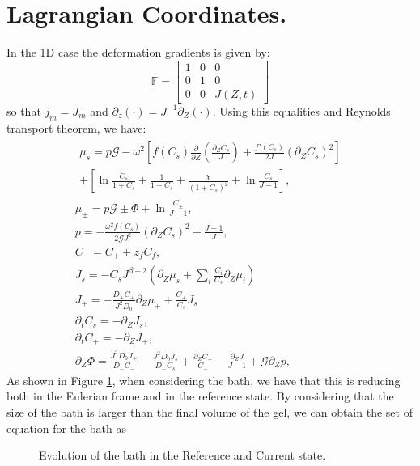 \documentclass[12pt]{extarticle}
\newcommand{\F}{\ensuremath{\mathbb{F}}}
\begin{document}
\section{Lagrangian Coordinates.}
In the 1D case the deformation gradients is given by:
\begin{equation}
\F=\begin{bmatrix}
1 & 0&0\\
0 & 1 & 0 \\
0 & 0 & J(Z,t)
\end{bmatrix}
\end{equation}
so that $j_m=J_m$ and $\partial_z(\cdot)=J^{-1}\partial_Z(\cdot)$. Using this equalities and Reynolds transport theorem, we have:
\begin{gather}
\begin{aligned}
\mu_s = p \mathcal{G}  - \omega^2\left[f(C_s)\frac{\partial}{\partial Z} \left(\frac{\partial_ZC_s}{J}\right)+\frac{f'(C_s)}{2J}\left(\partial_Z C_s\right)^2\right]\\
+ \left[\ln \frac{C_s}{1+C_s} + \frac{1}{1+C_s}+\frac{\chi}{(1+C_s)^2} + \ln \frac{C_s}{J-1} \right], 
\end{aligned}\\[2.5mm]
\mu_\pm = p \mathcal{G} \pm \Phi + \ln \frac{C_\pm}{J-1} ,\\
p=-\frac{\omega^2 f(C_s)}{2\mathcal{G}J^2} (\partial_Z C_s)^2+ \frac{J-1}{J},\\
C_- = C_+ + z_f C_f,\\
J_s =-C_s J^{\beta-2}  \left(\partial_Z\mu_s +\sum_i \frac{C_i}{C_s} \partial_Z \mu_i\right)\\
J_+= - \frac{D_+ C_+}{J^2D_0}\partial_Z \mu_+ + \frac{C_+}{C_s}J_s\\
\partial_t C_s =- \partial_Z J_s,\\
\partial_t C_+ = -\partial_Z J_+,\\
\partial_Z \Phi = \frac{J^2 D_0 J_+}{D_-C_-}- \frac{J^2 D_0 J_s}{D_-C_s}+ \frac{\partial_Z C_-}{C_-}-\frac{\partial_Z J}{J-1}+\mathcal{G}\partial_Z p,
\end{gather}
As shown in Figure \ref{Above}, when considering the bath, we have that this is reducing both in the Eulerian frame and in the reference state. By considering that the size of the bath is larger than the final volume of the gel, we can obtain the set of equation for the bath as  
\begin{figure}[h]
	\centering
	\def\svgwidth{0.7\linewidth}
	
	\caption{Evolution of the bath in the Reference and Current state.}
	\label{Above}
\end{figure}
\end{document}
